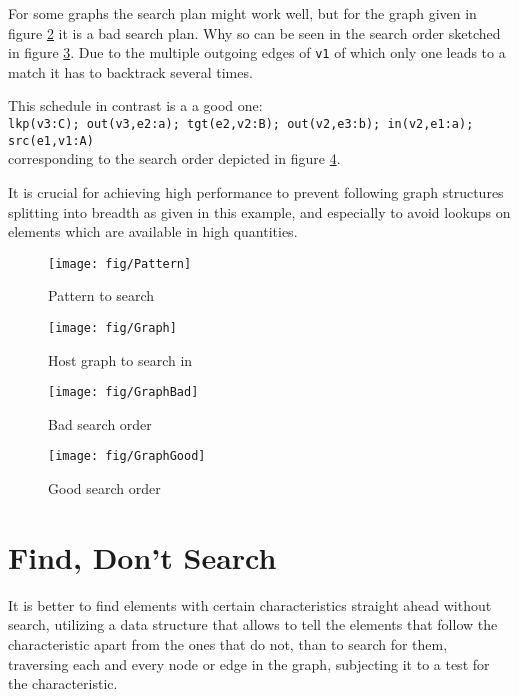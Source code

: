 For some graphs the search plan might work well, but for the graph given in figure \ref{perf:figgraphtosearchin} it is a bad search plan.
Why so can be seen in the search order sketched in figure \ref{perf:figbadsearch}.
Due to the multiple outgoing edges of \texttt{v1} of which only one leads to a match it has to backtrack several times.

This schedule in contrast is a a good one:\\
\texttt{lkp(v3:C); out(v3,e2:a); tgt(e2,v2:B); out(v2,e3:b); in(v2,e1:a); src(e1,v1:A)}\\
corresponding to the search order depicted in figure \ref{perf:figgoodsearch}.

It is crucial for achieving high performance to prevent following graph structures splitting into breadth as given in this example, and especially to avoid lookups on elements which are available in high quantities.

\begin{figure}[p]
  \centering
  \texttt{[image: fig/Pattern]}
  \caption{Pattern to search}
  \label{perf:figpatterntosearch}
\end{figure}

\begin{figure}[p]
  \centering
  \texttt{[image: fig/Graph]}
  \caption{Host graph to search in}
  \label{perf:figgraphtosearchin}
\end{figure}

\pagebreak

\begin{figure}[p]
  \centering
  \texttt{[image: fig/GraphBad]}
  \caption{Bad search order}
  \label{perf:figbadsearch}
\end{figure}

\begin{figure}[p]
  \centering
  \texttt{[image: fig/GraphGood]}
  \caption{Good search order}
  \label{perf:figgoodsearch}
\end{figure}


\section{Find, Don't Search}
It is better to find elements with certain characteristics straight ahead without search,
utilizing a data structure that allows to tell the elements that follow the characteristic apart from the ones that do not,
than to search for them, traversing each and every node or edge in the graph, subjecting it to a test for the characteristic.


